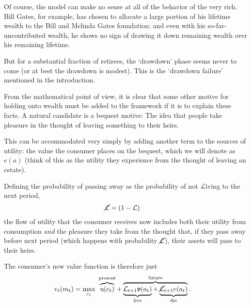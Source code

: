 \documentclass{article}
\newcommand{\uFunc}{\mathrm{u}}
\newcommand{\vFunc}{\mathrm{v}}
\newcommand{\Alive}{\mathcal{L}}
\newcommand{\cNrm}{c}
\newcommand{\aNrm}{a}
\newcommand{\mNrm}{m}
\newcommand{\bqstNrm}{e}
\begin{document}

Of course, the model can make no sense at all of the behavior of the very rich. Bill Gates, for example, has chosen to allocate a large portion of his lifetime wealth to the Bill and Melinda Gates foundation; and even with his so-far-uncontributed wealth, he shows no sign of drawing it down remaining wealth over his remaining lifetime.

But for a substantial fraction of retirees, the `drawdown' phase seems never to come (or at best the drawdown is modest).  This is the `drawdown failure' mentioned in the introduction.


% 
%

From the mathematical point of view, it is clear that some other motive for holding onto wealth must be added to the framework if it is to explain these facts. A natural candidate is a bequest motive: The idea that people take pleasure in the thought of leaving something to their heirs.

This can be accommodated very simply by adding another term to the sources of utility: the value the consumer places on the bequest, which we will denote as $\bqstNrm(\aNrm)$ (think of this as the utility they experience from the thought of leaving an $\bqstNrm$state).

Defining the probability of passing away as the probability of not $\Alive$iving to the next period,
\begin{align}
    \cancel{\Alive} & =(1-\Alive)
\end{align}
the flow of utility that the consumer receives now includes both their utility from consumption \textit{and} the pleasure they take from the thought that, if they pass away before next period (which happens with probability $\cancel{\Alive}$), their assets will pass to their heirs.

The consumer's new value function is therefore just
\begin{align}
    {\vFunc}_{t}({\mNrm}_{t}) & = \max_{\cNrm_{t}} ~ \overbrace{\uFunc(\cNrm_{t})}^{\text{present}}+\overbrace{\underbrace{\Alive_{t+1}\mathfrak{v}(\aNrm_{t})}_{\text{live}} + \underbrace{\cancel{\Alive}_{t+1}\bqstNrm({\aNrm}_{t})}_{\text{die}}
    }^{\text{future}}.
\end{align}
\end{document}
